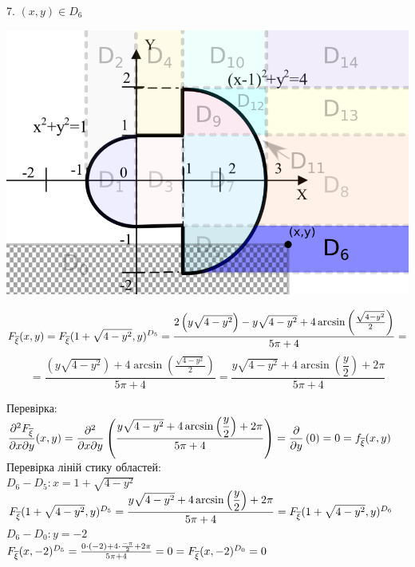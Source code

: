 \documentclass[14pt,a4paper]{scrartcl}
\theoremstyle{definition}
\theoremstyle{remark}
\theoremstyle{definition}
\theoremstyle{definition}
\begin{document}
7. $(x,y) \in D_6$
\begin{center} \includegraphics[scale=0.4]{assets/zone766.png} \end{center}
$$
F_{\overline{\xi}} (x,y) =  F_{\overline{\xi}} (1+\sqrt{4 - y^2}, y)^{D_5} =  \dfrac{2\left(y\sqrt{4 - y^2}\right)-y\sqrt{4 - y^2}+4\arcsin\left(\frac{\sqrt{4 - y^2}}{2}\right)}{5\pi +4}=
$$
$$
= \dfrac{\left(y\sqrt{4 - y^2}\right) + 4\arcsin\left(\frac{\sqrt{4 - y^2}}{2}\right)}{5\pi +4} =  \dfrac{y\sqrt{4 - y^2} + 4\arcsin\left(\dfrac{y}{2}\right) + 2\pi }{5\pi +4}
$$


Перевірка:\\
$\dfrac{\partial^2 F_{\overline{\xi}}}{\partial x \partial y}(x,y) =
\dfrac{\partial^2}{\partial x \partial y} \left(  \dfrac{y\sqrt{4 - y^2} + 4\arcsin\left(\dfrac{y}{2}\right) + 2\pi }{5\pi +4}
\right) = \dfrac{\partial}{ \partial y} \left(0 \right)  = 0=f_{\overline{\xi}} (x,y)$\\

Перевірка ліній стику областей:\\
$D_6 - D_5: x = 1 + \sqrt{4 - y^2}$\\
$ F_{\overline{\xi}} (1 + \sqrt{4 - y^2},y)^{D_5} =  \dfrac{y\sqrt{4 - y^2} + 4\arcsin\left(\dfrac{y}{2}\right) + 2\pi }{5\pi +4} = F_{\overline{\xi}} (1 + \sqrt{4 - y^2},y)^{D_6}$\\
$D_6 - D_0: y = -2$\\
$ F_{\overline{\xi}} (x,-2)^{D_5} =  \frac{0\cdot (-2) + 4 \cdot \frac{-\pi}{2}+ 2\pi  }{5\pi +4} = 0  = F_{\overline{\xi}} (x,-2)^{D_0} = 0$\\

\newpage
\end{document}
